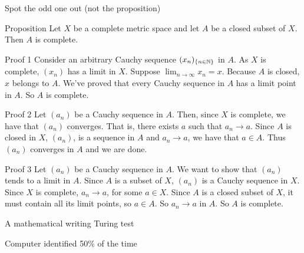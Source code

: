 \small

%

\begin{frame}
  \begin{block}{}
    \titlepage
  \end{block}
\end{frame}

\begin{frame}{Spot the odd one out (not the proposition)}
  \begin{block}{Proposition}
Let $X$ be a complete metric space and let $A$ be a closed subset of $X$. Then $A$ is complete.
  \end{block}
  \begin{block}{Proof 1}
Consider an arbitrary Cauchy sequence $(x_n)_{\{n\in\mathbb{N}\}}$ in $A$. As $X$ is complete, $(x_n)$ has a limit in $X$. Suppose $\lim_{n\to\infty} x_n = x$. Because $A$ is closed, $x$ belongs to $A$. We've proved that every Cauchy sequence in $A$ has a limit point in $A$. So $A$ is complete.
  \end{block}
  \begin{block}{Proof 2}
Let $(a_n)$ be a Cauchy sequence in $A$. Then, since $X$ is complete, we have that $(a_n)$ converges. That is, there exists $a$ such that $a_n \to a$. Since $A$ is closed in $X$, $(a_n)$, is a sequence in $A$ and $a_n \to a$, we have that $a \in A$. Thus $(a_n)$ converges in $A$ and we are done.
  \end{block}
  \begin{block}{Proof 3}
Let $(a_n)$ be a Cauchy sequence in $A$. We want to show that $(a_n)$ tends to a limit in $A$. Since $A$ is a subset of $X$, $(a_n)$ is a Cauchy sequence in $X$. Since $X$ is complete, $a_n \to a$, for some $a \in X$. Since $A$ is a closed subset of $X$, it must contain all its limit points, so $a \in A$. So $a_n \to a$ in $A$. So $A$ is complete.
  \end{block}
\end{frame}

\begin{frame}{A mathematical writing Turing test}
  \begin{block}{Computer identified 50\% of the time}
    \begin{center}
      
    \end{center}
  \end{block}
\end{frame}


